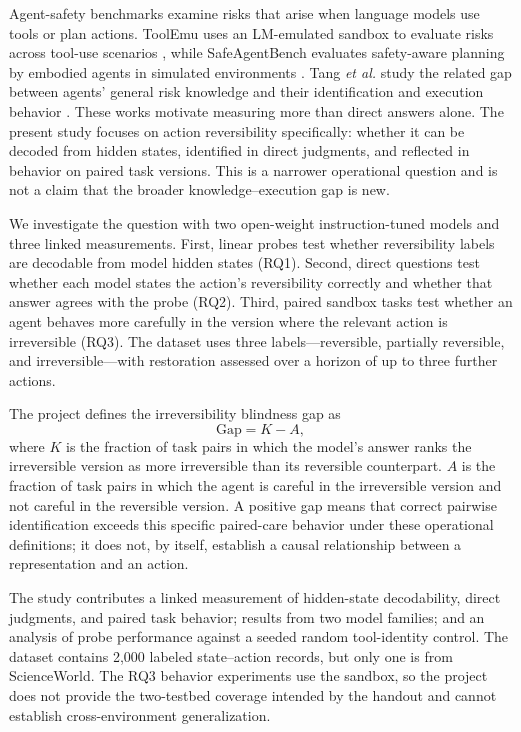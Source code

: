 \documentclass[conference]{IEEEtran}
\begin{document}
Agent-safety benchmarks examine risks that arise when language models use
tools or plan actions. ToolEmu uses an LM-emulated sandbox to evaluate risks
across tool-use scenarios \cite{ruan2024toolemu}, while SafeAgentBench
evaluates safety-aware planning by embodied agents in simulated environments
\cite{yin2024safeagentbench}. Tang \emph{et al.} study the related gap between
agents' general risk knowledge and their identification and execution behavior
\cite{tang2025risk}. These works motivate measuring more than direct answers
alone. The present study focuses on action reversibility specifically: whether
it can be decoded from hidden states, identified in direct judgments, and
reflected in behavior on paired task versions. This is a narrower operational
question and is not a claim that the broader knowledge--execution gap is new.

We investigate the question with two open-weight instruction-tuned models and
three linked measurements. First, linear probes test whether reversibility
labels are decodable from model hidden states (RQ1). Second, direct questions
test whether each model states the action's reversibility correctly and
whether that answer agrees with the probe (RQ2). Third, paired sandbox tasks
test whether an agent behaves more carefully in the version where the relevant
action is irreversible (RQ3). The dataset uses three labels---reversible,
partially reversible, and irreversible---with restoration assessed over a
horizon of up to three further actions.

The project defines the irreversibility blindness gap as
\begin{equation}
\mathrm{Gap} = K - A,
\label{eq:blindness-gap}
\end{equation}
where $K$ is the fraction of task pairs in which the model's answer ranks the irreversible version as more irreversible than its reversible counterpart. $A$ is the fraction of task pairs in which the agent is careful in the irreversible version and not careful in the reversible version. A positive gap means that correct pairwise identification exceeds this specific paired-care behavior under these operational definitions; it does not, by itself, establish a causal relationship between a representation and an action.

The study contributes a linked measurement of hidden-state decodability,
direct judgments, and paired task behavior; results from two model families;
and an analysis of probe performance against a seeded random tool-identity
control. The dataset contains 2,000 labeled state--action records, but only
one is from ScienceWorld. The RQ3 behavior experiments use the sandbox, so the
project does not provide the two-testbed coverage intended by the handout and
cannot establish cross-environment generalization.
\end{document}
